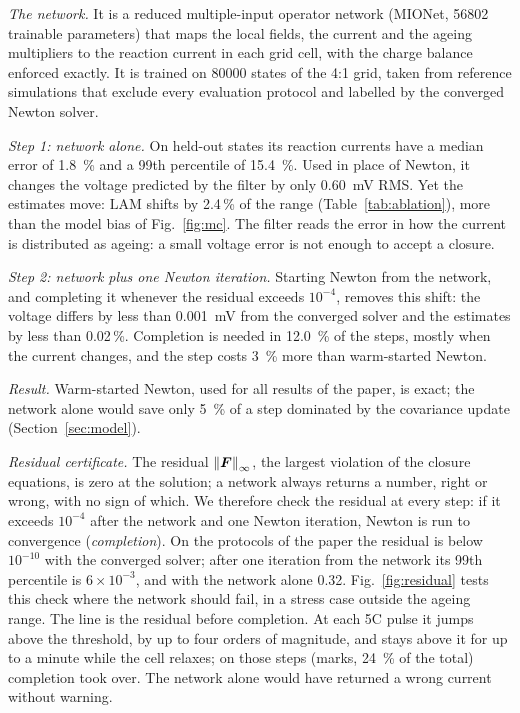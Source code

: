 \documentclass[journal]{IEEEtran}
\newcommand{\LAM}{\mathrm{LAM}}\newcommand{\LLI}{\mathrm{LLI}}\newcommand{\phipl}{\phi_{\mathrm{pl}}}
\newcommand{\norm}[1]{\left\lVert #1 \right\rVert}
\begin{document}
\emph{The network.} It is a reduced multiple-input operator network (MIONet, \num{56802} trainable parameters) that maps the local fields, the current and the ageing multipliers to the reaction current in each grid cell, with the charge balance enforced exactly. It is trained on \num{80000} states of the 4:1 grid, taken from reference simulations that exclude every evaluation protocol and labelled by the converged Newton solver.

\emph{Step 1: network alone.} On held-out states its reaction currents have a median error of \SI{1.8}{\percent} and a 99th percentile of \SI{15.4}{\percent}. Used in place of Newton, it changes the voltage predicted by the filter by only \SI{0.60}{\milli\volt} RMS. Yet the estimates move: $\LAM$ shifts by 2.4\,\% of the range (Table~\ref{tab:ablation}), more than the model bias of Fig.~\ref{fig:mc}. The filter reads the error in how the current is distributed as ageing: a small voltage error is not enough to accept a closure.

\emph{Step 2: network plus one Newton iteration.} Starting Newton from the network, and completing it whenever the residual exceeds $10^{-4}$, removes this shift: the voltage differs by less than \SI{0.001}{\milli\volt} from the converged solver and the estimates by less than 0.02\,\%. Completion is needed in \SI{12.0}{\percent} of the steps, mostly when the current changes, and the step costs \SI{3}{\percent} more than warm-started Newton.

\emph{Result.} Warm-started Newton, used for all results of the paper, is exact; the network alone would save only \SI{5}{\percent} of a step dominated by the covariance update (Section~\ref{sec:model}).

\emph{Residual certificate.} The residual $\norm{\vF}_\infty$, the largest violation of the closure equations, is zero at the solution; a network always returns a number, right or wrong, with no sign of which. We therefore check the residual at every step: if it exceeds $10^{-4}$ after the network and one Newton iteration, Newton is run to convergence (\emph{completion}). On the protocols of the paper the residual is below $10^{-10}$ with the converged solver; after one iteration from the network its 99th percentile is $6\times10^{-3}$, and with the network alone 0.32. Fig.~\ref{fig:residual} tests this check where the network should fail, in a stress case outside the ageing range. The line is the residual before completion. At each 5C pulse it jumps above the threshold, by up to four orders of magnitude, and stays above it for up to a minute while the cell relaxes; on those steps (marks, \SI{24}{\percent} of the total) completion took over. The network alone would have returned a wrong current without warning.
\end{document}
